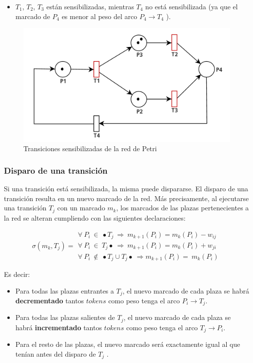 \begin{itemize}
    \item $T_1$, $T_2$, $T_3$ están sensibilizadas, mientras $T_4$ no está sensibilizada (ya que el marcado de $P_4$ es menor al peso del arco $P_4 \rightarrow T_4$ ).
\end{itemize}

\begin{figure}[H]
    \centering
    \includegraphics[width=0.6\linewidth]{images/rdp_sensibilizada.png}
    \caption{Transiciones sensibilizadas de la red de Petri}
    \label{fig:rdp_sensibilizada}
\end{figure}

\subsubsection{Disparo de una transición}
Si una transición está sensibilizada, la misma puede dispararse. El disparo de una transición resulta en un nuevo marcado de la red. Más precisamente, al ejecutarse una transición $T_j$ con un marcado $m_k$, los marcados de las plazas pertenecientes a la red se alteran cumpliendo con las siguientes declaraciones:

\begin{equation}
    \sigma (m_k, T_j) = 
    \begin{array}{cc}
         \forall \ P_i \ \in \ \bullet T_j \ \Rightarrow \ m_{k+1}(P_i) = m_k(P_i) - w_{ij}  \\
         \forall \ P_i \ \in \ T_j \bullet \ \Rightarrow \ m_{k+1}(P_i) = m_k(P_i) + w_{ji}  \\
         \forall \ P_i \ \notin \ \bullet T_j \cup T_j \bullet \ \Rightarrow m_{k+1}(P_i) = \ m_k(P_i)
    \end{array}
\end{equation}

\noindent Es decir:
\begin{itemize}
    \item Para todas las plazas entrantes a $T_j$, el nuevo marcado de cada plaza se habrá \textbf{decrementado} tantos $tokens$ como peso tenga el arco $P_i \rightarrow T_j$. 
    \item Para todas las plazas salientes de $T_j$, el nuevo marcado de cada plaza se habrá \textbf{incrementado} tantos $tokens$ como peso tenga el arco $T_j \rightarrow P_i$.
    \item Para el resto de las plazas, el nuevo marcado será exactamente igual al que tenían antes del disparo de $T_j$ .
\end{itemize}

